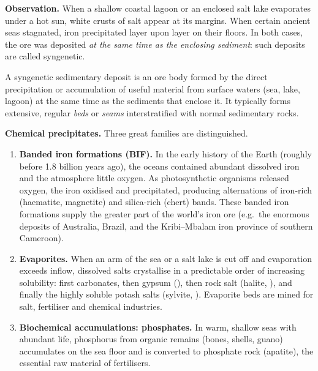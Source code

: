 \documentclass[11pt]{article}
\newcommand{\cle}[1]{{\popxbold\color{popdark}#1}}
\newcounter{popsec}
\newcounter{popsub}
\newcommand{\courssub}[1]{%
  \stepcounter{popsub}%
  \par\vspace{9pt}\noindent{\popxbold\fontsize{11.5}{13}\selectfont\color{popink}{\color{poporange}\thepopsec.\thepopsub}\hspace{6pt}#1}\par\nopagebreak\vspace{4pt}
}
\begin{document}
\courssub{Sedimentary (Syngenetic) Deposits}

\textbf{Observation.} When a shallow coastal lagoon or an enclosed salt lake evaporates under a hot sun, white crusts of salt appear at its margins. When certain ancient seas stagnated, iron precipitated layer upon layer on their floors. In both cases, the ore was deposited \emph{at the same time as the enclosing sediment}: such deposits are called \cle{syngenetic}.

\begin{definition}
A \cle{syngenetic sedimentary deposit} is an ore body formed by the direct precipitation or accumulation of useful material from surface waters (sea, lake, lagoon) at the same time as the sediments that enclose it. It typically forms extensive, regular \emph{beds} or \emph{seams} interstratified with normal sedimentary rocks.
\end{definition}

\textbf{Chemical precipitates.} Three great families are distinguished.

\begin{enumerate}
\item \textbf{Banded iron formations (BIF).} In the early history of the Earth (roughly before 1.8 billion years ago), the oceans contained abundant dissolved iron and the atmosphere little oxygen. As photosynthetic organisms released oxygen, the iron oxidised and precipitated, producing alternations of iron-rich (haematite, magnetite) and silica-rich (chert) bands. These \cle{banded iron formations} supply the greater part of the world's iron ore (e.g.\ the enormous deposits of Australia, Brazil, and the Kribi--Mbalam iron province of southern Cameroon).
\item \textbf{Evaporites.} When an arm of the sea or a salt lake is cut off and evaporation exceeds inflow, dissolved salts crystallise in a predictable order of increasing solubility: first carbonates, then \cle{gypsum} (), then rock salt (\cle{halite}, ), and finally the highly soluble \cle{potash} salts (sylvite, ). Evaporite beds are mined for salt, fertiliser and chemical industries.
\item \textbf{Biochemical accumulations: phosphates.} In warm, shallow seas with abundant life, phosphorus from organic remains (bones, shells, guano) accumulates on the sea floor and is converted to \cle{phosphate} rock (apatite), the essential raw material of fertilisers.
\end{enumerate}
\end{document}
